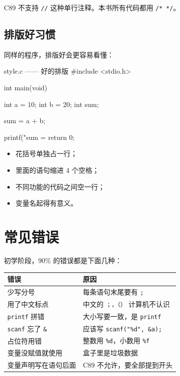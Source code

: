 \begin{c89box}[C89 只用块注释]
C89 不支持 \texttt{//} 这种单行注释。本书所有代码都用 \texttt{/* */}。
\end{c89box}

\subsection{排版好习惯}

同样的程序，排版好会更容易看懂：

\begin{codebox}{style.c —— 好的排版}
#include <stdio.h>

int main(void)
{
    int a = 10;
    int b = 20;
    int sum;

    sum = a + b;

    printf("sum = %
    return 0;
}
\end{codebox}

\begin{itemize}
  \item 花括号单独占一行；
  \item 里面的语句缩进 4 个空格；
  \item 不同功能的代码之间空一行；
  \item 变量名起得有意义。
\end{itemize}

\section{常见错误}

初学阶段，90\% 的错误都是下面几种：

\begin{center}
\begin{tabular}{@{}p{}p{}@{}}
\toprule
错误 & 原因 \\
\midrule
少写分号 & 每条语句末尾要有 \texttt{;} \\
用了中文标点 & 中文的 \texttt{；，（）} 计算机不认识 \\
\texttt{printf} 拼错 & 大小写要一致，是 \texttt{printf} \\
\texttt{scanf} 忘了 \texttt{\&} & 应该写 \texttt{scanf("\%d", \&a);} \\
占位符用错 & 整数用 \texttt{\%d}，小数用 \texttt{\%f} \\
变量没赋值就使用 & 盒子里是垃圾数据 \\
变量声明写在语句后面 & C89 不允许，要全部提到开头 \\
\bottomrule
\end{tabular}
\end{center}

